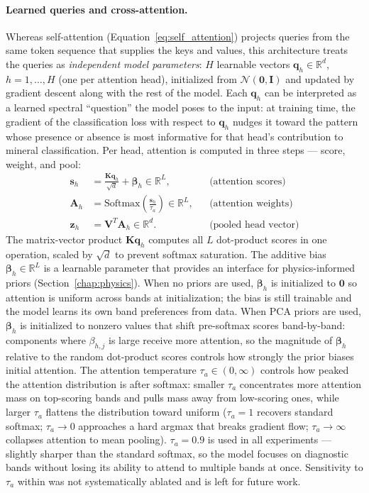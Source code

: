 \documentclass[11pt]{report}
\newcommand{\R}{\mathbb{R}}
\begin{document}
\paragraph{Learned queries and cross-attention.}
Whereas self-attention (Equation~\ref{eq:self_attention}) projects queries from the same token sequence that supplies the keys and values, this architecture treats the queries as \emph{independent model parameters}: $H$ learnable vectors $\mathbf{q}_h \in \R^d$, $h = 1, \ldots, H$ (one per attention head), initialized from $\mathcal{N}(\mathbf{0}, \mathbf{I})$ and updated by gradient descent along with the rest of the model. Each $\mathbf{q}_h$ can be interpreted as a learned spectral ``question'' the model poses to the input: at training time, the gradient of the classification loss with respect to $\mathbf{q}_h$ nudges it toward the pattern whose presence or absence is most informative for that head's contribution to mineral classification. Per head, attention is computed in three steps --- score, weight, and pool:
\begin{align}
\mathbf{s}_h &= \frac{\mathbf{K}\mathbf{q}_h}{\sqrt{d}} + \bm{\beta}_h \in \R^L, & & \text{(attention scores)} \label{eq:attn_score} \\
\mathbf{A}_h &= \text{Softmax}\!\left(\frac{\mathbf{s}_h}{\tau_a}\right) \in \R^L, & & \text{(attention weights)} \label{eq:attn_weight} \\
\mathbf{z}_h &= \mathbf{V}^T \mathbf{A}_h \in \R^d. & & \text{(pooled head vector)} \label{eq:attn_pool}
\end{align}
The matrix-vector product $\mathbf{K}\mathbf{q}_h$ computes all $L$ dot-product scores in one operation, scaled by $\sqrt{d}$ to prevent softmax saturation.
The additive bias $\bm{\beta}_h \in \R^L$ is a learnable parameter that provides an interface for physics-informed priors (Section~\ref{chap:physics}).
When no priors are used, $\bm{\beta}_h$ is initialized to $\mathbf{0}$ so attention is uniform across bands at initialization; the bias is still trainable and the model learns its own band preferences from data.
When PCA priors are used, $\bm{\beta}_h$ is initialized to nonzero values that shift pre-softmax scores band-by-band: components where $\beta_{h,j}$ is large receive more attention, so the magnitude of $\bm{\beta}_h$ relative to the random dot-product scores controls how strongly the prior biases initial attention.
The attention temperature $\tau_a \in (0, \infty)$ controls how peaked the attention distribution is after softmax: smaller $\tau_a$ concentrates more attention mass on top-scoring bands and pulls mass away from low-scoring ones, while larger $\tau_a$ flattens the distribution toward uniform ($\tau_a = 1$ recovers standard softmax; $\tau_a \to 0$ approaches a hard argmax that breaks gradient flow; $\tau_a \to \infty$ collapses attention to mean pooling). $\tau_a = 0.9$ is used in all experiments --- slightly sharper than the standard softmax, so the model focuses on diagnostic bands without losing its ability to attend to multiple bands at once. Sensitivity to $\tau_a$ within was not systematically ablated and is left for future work.
\end{document}
